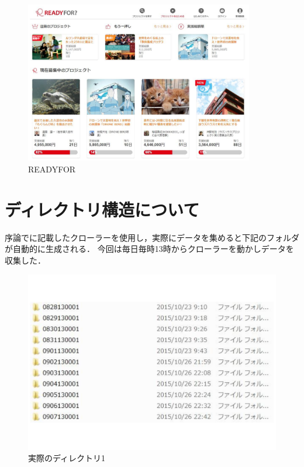 \begin{figure}[H]
\centering
\includegraphics[width=10cm]{figure17.pdf}
\caption{READYFOR}\label{sannp}
\end{figure}



\section{ディレクトリ構造について}

序論でに記載したクローラーを使用し，実際にデータを集めると下記のフォルダが自動的に生成される．
今回は毎日毎時13時からクローラーを動かしデータを収集した．

\begin{figure}[H]
\centering
\includegraphics[width=13cm]{figure29.pdf}
\caption{実際のディレクトリ1}\label{sannp}
\end{figure}

